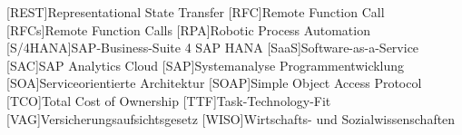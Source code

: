 \begin{acronym}[XXXXXXX]
	[REST]{Representational State Transfer}
	[RFC]{Remote Function Call}
	[RFCs]{Remote Function Calls}
	[RPA]{Robotic Process Automation}
	[S/4HANA]{SAP-Business-Suite 4 SAP HANA}
	[SaaS]{Software-as-a-Service}
	[SAC]{SAP Analytics Cloud}
	[SAP]{Systemanalyse Programmentwicklung}
	[SOA]{Serviceorientierte Architektur}
	[SOAP]{Simple Object Access Protocol}
	[TCO]{Total Cost of Ownership}
	[TTF]{Task-Technology-Fit}
	[VAG]{Versicherungsaufsichtsgesetz}
	[WISO]{Wirtschafts- und Sozialwissenschaften}

\end{acronym}